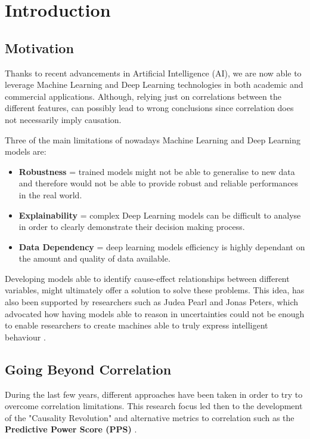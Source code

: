 \chapter{Introduction}
\section{Motivation}
\vspace{-0.1cm}
Thanks to recent advancements in Artificial Intelligence (AI), we are now able to leverage Machine Learning and Deep Learning technologies in both academic and commercial applications. Although, relying just on correlations between the different features, can possibly lead to wrong conclusions since correlation does not necessarily imply causation.

Three of the main limitations of nowadays Machine Learning and Deep Learning models are: 
\vspace{-0.2cm}
\begin{itemize}
    \item \textbf{Robustness} = trained models might not be able to generalise to new data and therefore would not be able to provide robust and reliable performances in the real world.
    \item \textbf{Explainability} = complex Deep Learning models can be difficult to analyse in order to clearly demonstrate their decision making process. 
    \item \textbf{Data Dependency} = deep learning models efficiency is highly dependant on the amount and quality of data available. 
\end{itemize}
\vspace{-0.2cm}
Developing models able to identify cause-effect relationships between different variables, might ultimately offer a solution to solve these problems. This idea, has also been supported by researchers such as Judea Pearl and Jonas Peters, which advocated how having models able to reason in uncertainties could not be enough to enable researchers to create machines able to truly express intelligent behaviour \cite{art_perl}.

\section{Going Beyond Correlation}
During the last few years, different approaches have been taken in order to try to overcome correlation limitations. This research focus led then to the development of the "Causality Revolution" and alternative metrics to correlation such as the \textbf{Predictive Power Score (PPS)} \cite{ppc}.

